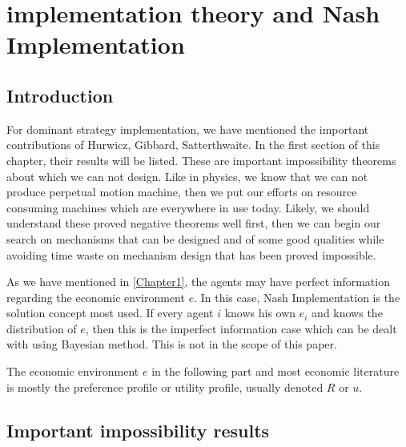 
\chapter{implementation theory and Nash Implementation  }  %

\label{Chapter2} %




\section{Introduction}
For dominant strategy implementation, we have mentioned the important
contributions of Hurwicz, Gibbard, Satterthwaite. In the first section
of this chapter, their results will be listed. These are
important impossibility theorems about which we can not design. Like
in physics, we know that we can not produce perpetual motion machine,
then we put our efforts on resource consuming machines which are
everywhere in use today. Likely, we should understand these proved
negative theorems well first, then we can begin our search on
mechanisms that can be designed and of some good qualities while
avoiding time waste on mechanism design that has been proved impossible.


As we have mentioned in \ref{Chapter1}, the agents may have perfect
information regarding the economic environment $e$. In this case, Nash
Implementation is the solution concept most used.
If every agent $i$ knows his own $e_i$ and
knows the distribution of $e$, then this is the imperfect information
case which can be dealt with using Bayesian method.  This is not in the scope of this paper.

The economic environment $e$ in the following part and most economic literature is mostly the preference profile or utility profile, usually denoted $R$ or $u$.
\section{Important impossibility results}

